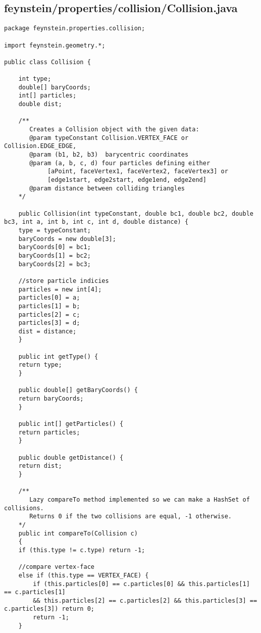 \subsection*{feynstein/properties/collision/Collision.java}
\begin{lstlisting}
package feynstein.properties.collision;

import feynstein.geometry.*;

public class Collision {

    int type;
    double[] baryCoords;
    int[] particles;
    double dist;

    /**
       Creates a Collision object with the given data:
       @param typeConstant Collision.VERTEX_FACE or Collision.EDGE_EDGE,
       @param (b1, b2, b3)  barycentric coordinates
       @param (a, b, c, d) four particles defining either 
            [aPoint, faceVertex1, faceVertex2, faceVertex3] or
            [edge1start, edge2start, edge1end, edge2end]
       @param distance between colliding triangles
    */
       
    public Collision(int typeConstant, double bc1, double bc2, double bc3, int a, int b, int c, int d, double distance) {
	type = typeConstant;
	baryCoords = new double[3];
	baryCoords[0] = bc1;
	baryCoords[1] = bc2;
	baryCoords[2] = bc3;

	//store particle indicies
	particles = new int[4];
	particles[0] = a;
	particles[1] = b;
	particles[2] = c;
	particles[3] = d;
	dist = distance;
    }

    public int getType() {
	return type;
    }

    public double[] getBaryCoords() {
	return baryCoords;
    }

    public int[] getParticles() {
	return particles;
    }

    public double getDistance() {
	return dist;
    }

    /**
       Lazy compareTo method implemented so we can make a HashSet of collisions. 
       Returns 0 if the two collisions are equal, -1 otherwise.
    */
    public int compareTo(Collision c)
    {
	if (this.type != c.type) return -1;

	//compare vertex-face
	else if (this.type == VERTEX_FACE) {
	    if (this.particles[0] == c.particles[0] && this.particles[1] == c.particles[1]
		&& this.particles[2] == c.particles[2] && this.particles[3] == c.particles[3]) return 0;
	    return -1;
	}


\end{lstlisting}
